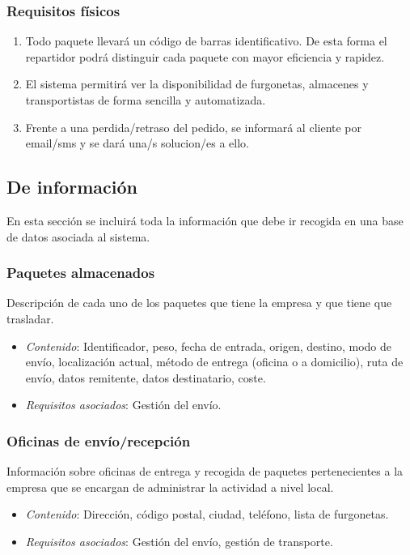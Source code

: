 \subsubsection{Requisitos físicos}
\begin{enumerate}
	\item Todo paquete llevará un código de barras identificativo. De esta forma el repartidor podrá distinguir cada paquete con mayor eficiencia y rapidez.
    \item El sistema permitirá ver la disponibilidad  de furgonetas, almacenes y transportistas de forma sencilla y automatizada.
    \item Frente a una perdida/retraso del pedido, se informará al cliente por email/sms y se dará una/s solucion/es a ello.
    \end{enumerate}


\newpage

\subsection{De información}
	En esta sección se incluirá toda la información que debe ir recogida en una base de datos asociada al sistema.
\subsubsection{Paquetes almacenados}
	Descripción de cada uno de los paquetes que tiene la empresa y que tiene que trasladar. 
\begin{itemize}
	\item \textit{Contenido}: Identificador, peso, fecha de entrada, origen, destino, modo de envío, localización actual, método de entrega (oficina o a domicilio), ruta de envío, datos remitente, datos destinatario, coste.
	\item \textit{Requisitos asociados}: Gestión del envío. \\
\end{itemize}


\subsubsection{Oficinas de envío/recepción}
 	Información sobre oficinas de entrega y recogida de paquetes pertenecientes a la empresa que se encargan de administrar la actividad a nivel local.
\begin{itemize}
	\item \textit{Contenido}: Dirección, código postal, ciudad, teléfono, lista de furgonetas. 
	\item \textit{Requisitos asociados}: Gestión del envío, gestión de transporte. \\
\end{itemize}


